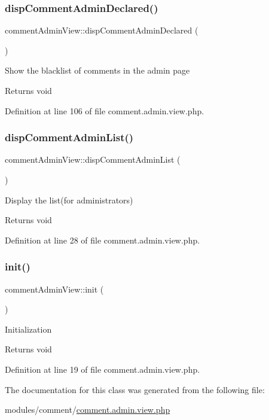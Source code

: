 \subsubsection{\texorpdfstring{disp\+Comment\+Admin\+Declared()}{dispCommentAdminDeclared()}}
{\footnotesize\ttfamily comment\+Admin\+View\+::disp\+Comment\+Admin\+Declared (\begin{DoxyParamCaption}{ }\end{DoxyParamCaption})}

Show the blacklist of comments in the admin page \begin{DoxyReturn}{Returns}
void 
\end{DoxyReturn}


Definition at line 106 of file comment.\+admin.\+view.\+php.

\hypertarget{classcommentAdminView_a979a3095a55ec0e9356db470c6425639}{}\label{classcommentAdminView_a979a3095a55ec0e9356db470c6425639} 
\subsubsection{\texorpdfstring{disp\+Comment\+Admin\+List()}{dispCommentAdminList()}}
{\footnotesize\ttfamily comment\+Admin\+View\+::disp\+Comment\+Admin\+List (\begin{DoxyParamCaption}{ }\end{DoxyParamCaption})}

Display the list(for administrators) \begin{DoxyReturn}{Returns}
void 
\end{DoxyReturn}


Definition at line 28 of file comment.\+admin.\+view.\+php.

\hypertarget{classcommentAdminView_a61733eebabe2434e133bbd516d8f68c5}{}\label{classcommentAdminView_a61733eebabe2434e133bbd516d8f68c5} 
\subsubsection{\texorpdfstring{init()}{init()}}
{\footnotesize\ttfamily comment\+Admin\+View\+::init (\begin{DoxyParamCaption}{ }\end{DoxyParamCaption})}

Initialization \begin{DoxyReturn}{Returns}
void 
\end{DoxyReturn}


Definition at line 19 of file comment.\+admin.\+view.\+php.



The documentation for this class was generated from the following file\+:\begin{DoxyCompactItemize}
\item 
modules/comment/\hyperlink{comment_8admin_8view_8php}{comment.\+admin.\+view.\+php}\end{DoxyCompactItemize}
